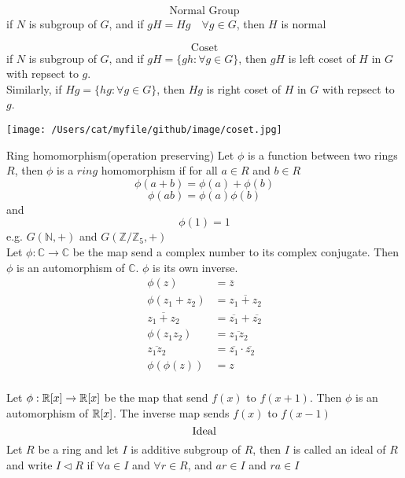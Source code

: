 \documentclass[10pt]{article}
\newcommand{\polyringr}[2][R]{\mathbb{#1}\scalebox{1}[.95]{[}#2\scalebox{1}[.95]{]}}
\begin{document}
\[\text{Normal Group} \]
if $N$ is subgroup of $G$, and if $gH = Hg \quad \forall g \in G$, then $H$ is normal

\[ \text{Coset} \]
if $N$ is subgroup of $G$, and if $gH = \{gh: \forall g \in G \}$, then $gH$ is left coset of $H$ in $G$ with repsect to $g$.\\
Similarly, if $Hg = \{hg: \forall g \in G \}$, then $Hg$ is right coset of $H$ in $G$ with repsect to $g$.\\
\begin{center}
\texttt{[image: /Users/cat/myfile/github/image/coset.jpg]}\\
\end{center}

\newpage
Ring homomorphism(operation preserving)
Let $\phi$ is a function between two rings $R$, then $\phi$ is a $\mathit{ring}$ homomorphism if
for all $a \in R$ and $b \in R$ 
\[\phi(a+b) = \phi(a) + \phi(b)\] 
\[\phi(ab) = \phi(a)\phi(b)\]
and \[\phi(1) = 1\]
e.g. $G(\mathbb{N}, +)$ and $G(\mathbb{Z}/\mathbb{Z}_5, +)$\\

Let $\phi: \mathbb{C} \rightarrow \mathbb{C}$ be the map send a complex number to its complex conjugate. Then $\phi$ is an automorphism of $\mathbb{C}$. 
$\phi$ is its own inverse.\\

\begin{equation}
\begin{aligned}
\phi(z) &= \overline{z}\\
\phi(z_1 + z_2) &= \overline{z_1 + z_2}\\
\overline{z_1 + z_2} &= \overline{z_1} + \overline{z_2}\\
\phi(z_1 z_2) &= \overline{z_1 z_2}\\
\overline{z_1 z_2} &= \overline{z_1} \cdot \overline{z_2} \nonumber\\
\phi(\phi(z)) &= z\\
\end{aligned}
\end{equation}

Let $\phi: \polyringr{x} \rightarrow  \polyringr{x}$ be the map that send $f(x)$ to $f(x+1)$. Then $\phi$ is an automorphism of $\polyringr{x}$.   
The inverse map sends $f(x)$ to $f(x-1)$\\

\[ \text{Ideal}\\ \]
Let $R$ be a ring and let $I$ is additive subgroup of $R$, then $I$ is called an ideal of $R$ and write $I \triangleleft R$ 
\quad if $\forall a \in I$ and $\forall r \in R $, and $ ar \in I$ and $ra \in I$\\
\end{document}
